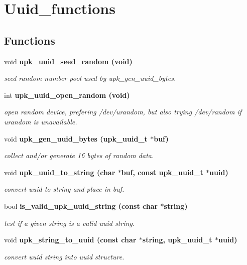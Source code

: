 \section{Uuid\_\-functions}
\label{group__uuid__functions}
\subsection*{Functions}
\begin{CompactItemize}
\item 
void \bf{upk\_\-uuid\_\-seed\_\-random} (void)
\begin{CompactList}\small\item\em seed random number pool used by upk\_\-gen\_\-uuid\_\-bytes. \item\end{CompactList}\item 
int \bf{upk\_\-uuid\_\-open\_\-random} (void)
\begin{CompactList}\small\item\em open random device, prefering /dev/urandom, but also trying /dev/random if urandom is unavailable. \item\end{CompactList}\item 
void \bf{upk\_\-gen\_\-uuid\_\-bytes} (\bf{upk\_\-uuid\_\-t} $\ast$buf)
\begin{CompactList}\small\item\em collect and/or generate 16 bytes of random data. \item\end{CompactList}\item 
void \bf{upk\_\-uuid\_\-to\_\-string} (char $\ast$buf, const \bf{upk\_\-uuid\_\-t} $\ast$uuid)
\begin{CompactList}\small\item\em convert uuid to string and place in buf. \item\end{CompactList}\item 
bool \bf{is\_\-valid\_\-upk\_\-uuid\_\-string} (const char $\ast$string)
\begin{CompactList}\small\item\em test if a given string is a valid uuid string. \item\end{CompactList}\item 
void \bf{upk\_\-string\_\-to\_\-uuid} (const char $\ast$string, \bf{upk\_\-uuid\_\-t} $\ast$uuid)
\begin{CompactList}\small\item\em convert uuid string into uuid structure. \item\end{CompactList}\end{CompactItemize}


